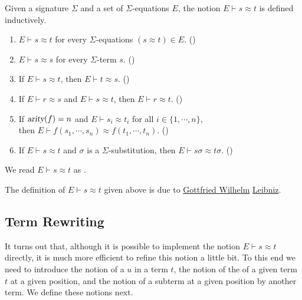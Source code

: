 \begin{Definition} \hspace*{\fill} \linebreak
  Given a signature $\Sigma$ and a set of $\Sigma$-equations $E$, the notion
  $E \vdash s \approx t$ is defined inductively.
  \begin{enumerate}
  \item $E \vdash s \approx t$ \quad for every $\Sigma$-equations $(s \approx t) \in E$. \hspace*{\fill} ()
  \item $E \vdash s \approx s$ \quad for every $\Sigma$-term $s$. \hspace*{\fill} ()
  \item If $E \vdash s \approx t$, then $E \vdash t \approx s$.  \hspace*{\fill} ()
  \item If $E \vdash r \approx s$ and $E \vdash s \approx t$, then $E \vdash r \approx t$.  
        \hspace*{\fill} ()
  \item If $\textsl{arity}(f) = n$ and $E \vdash s_i \approx t_i$ for all $i \in \{1,\cdots,n\}$, \\
        then $E \vdash f(s_1,\cdots,s_n) \approx f(t_1,\cdots,t_n)$.
        \hspace*{\fill} ()
  \item If $E \vdash s \approx t$ and $\sigma$ is a $\Sigma$-substitution, then $E \vdash s\sigma \approx
  t\sigma$. 
        \hspace*{\fill} ()
  \end{enumerate}
  We read $E \vdash s \approx t$ as .
  \eoxs
\end{Definition}
The definition of $E \vdash s \approx t$ given above is due to 
\href{https://en.wikipedia.org/wiki/Gottfried_Wilhelm_Leibniz}{Gottfried Wilhelm}
\href{https://leibniz.com/en/keks-original}{Leibniz}.

\subsection{Term Rewriting}
It turns out that, although it is possible to implement the notion $E \vdash s \approx t$ directly, it is much
more efficient to refine this notion a little bit.  To this end we need to introduce the notion of a
 $u$ in a term $t$, the notion of the  of a given term $t$ at a given position,
and the notion of  a subterm at a given position by another term.  We define these notions
next. 

